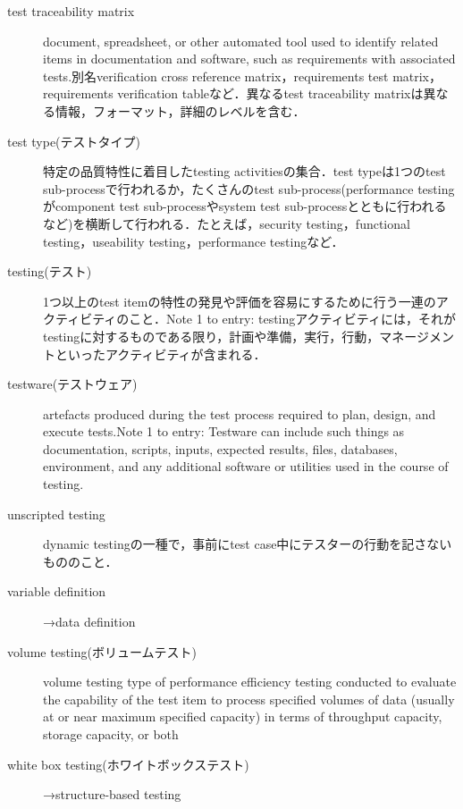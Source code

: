 \begin{description}
    \item[test traceability matrix]document, spreadsheet, or other automated tool used to identify related items in documentation and software, such as requirements with associated tests.別名verification cross reference matrix，requirements test matrix，requirements verification tableなど．異なるtest traceability matrixは異なる情報，フォーマット，詳細のレベルを含む．
    \item[test type(テストタイプ)]特定の品質特性に着目したtesting activitiesの集合．test typeは1つのtest sub-processで行われるか，たくさんのtest sub-process(performance testingがcomponent test sub-processやsystem test sub-processとともに行われるなど)を横断して行われる．たとえば，security testing，functional testing，useability testing，performance testingなど．
    \item[testing(テスト)]1つ以上のtest itemの特性の発見や評価を容易にするために行う一連のアクティビティのこと．Note 1 to entry: testingアクティビティには，それがtestingに対するものである限り，計画や準備，実行，行動，マネージメントといったアクティビティが含まれる．
    \item[testware(テストウェア)]artefacts produced during the test process required to plan, design, and execute tests.Note 1 to entry: Testware can include such things as documentation, scripts, inputs, expected results, files, databases, environment, and any additional software or utilities used in the course of testing.
    \item[unscripted testing]dynamic testingの一種で，事前にtest case中にテスターの行動を記さないもののこと．
    \item[variable definition]→data definition
    \item[volume testing(ボリュームテスト)]volume testing type of performance efficiency testing conducted to evaluate the capability of the test item to process specified volumes of data (usually at or near maximum specified capacity) in terms of throughput capacity, storage capacity, or both
    \item[white box testing(ホワイトボックステスト)]→structure-based testing
\end{description}


